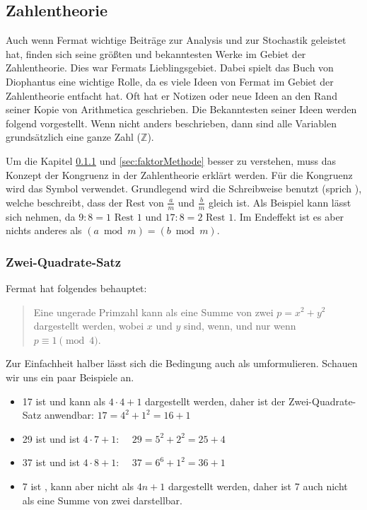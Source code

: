 \subsection{Zahlentheorie} \label{sec:zahlentheorie}
Auch wenn Fermat wichtige Beiträge zur Analysis und zur Stochastik geleistet hat, finden sich seine größten und bekanntesten Werke im Gebiet der \Gls{Zahlentheorie}. Dies war Fermats Lieblingsgebiet. Dabei spielt das Buch \textit{} von Diophantus eine wichtige Rolle, da es viele Ideen von Fermat im Gebiet der \Gls{Zahlentheorie} entfacht hat. Oft hat er Notizen oder neue Ideen an den Rand seiner Kopie von Arithmetica geschrieben. Die Bekanntesten seiner Ideen werden folgend vorgestellt. Wenn nicht anders beschrieben, dann sind alle Variablen grundsätzlich eine ganze Zahl ($\mathbb{Z}$).

Um die Kapitel \ref{sec:2sqr} und \ref{sec:faktorMethode} besser zu verstehen, muss das Konzept der \Gls{Kongruenz} in der \Gls{Zahlentheorie} erklärt werden. Für die \Gls{Kongruenz} wird das Symbol  verwendet. Grundlegend wird die Schreibweise  benutzt (sprich ), welche beschreibt, dass der Rest von $\frac{a}{m}$ und $\frac{b}{m}$ gleich ist. Als Beispiel kann lässt sich  nehmen, da $9 : 8 = 1 \text{ Rest } 1$ und $17 : 8 = 2 \text{ Rest } 1$. Im Endeffekt ist es aber nichts anderes als $(a \bmod m) = (b \bmod m)$.

\subsubsection{Zwei-Quadrate-Satz} \label{sec:2sqr}
Fermat hat folgendes behauptet:

\begin{quote}
    Eine ungerade \Gls{Primzahl} kann als eine Summe von zwei  $p = x^2 + y^2$ dargestellt werden, wobei $x$ und $y$  sind, wenn, und nur wenn $p \equiv 1 \pmod{4}$.
\end{quote}

Zur Einfachheit halber lässt sich die Bedingung  auch als  umformulieren. Schauen wir uns ein paar Beispiele an.

\begin{itemize}
    \item 17 ist  und kann als $4 \cdot 4 + 1$ dargestellt werden, daher ist der Zwei-Quadrate-Satz anwendbar: $17 = 4^2 + 1^2 = 16 + 1$
    \item 29 ist  und ist $4 \cdot 7 + 1$: $\quad 29 = 5^2 + 2^2 = 25 + 4$
    \item 37 ist  und ist $4 \cdot 8 + 1$: $\quad 37 = 6^6 + 1^2 = 36 + 1$
    \item 7 ist , kann aber nicht als $4n + 1$ dargestellt werden, daher ist 7 auch nicht als eine Summe von zwei  darstellbar.
\end{itemize}


